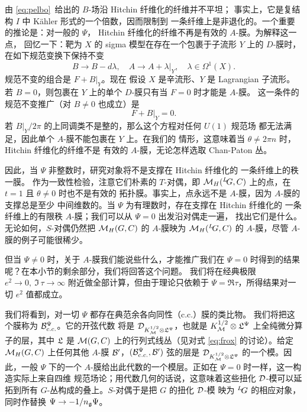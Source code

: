 由 \eqref{eq:pelbo}\ 给出的 $B$-场沿 Hitchin 纤维化的纤维并不平坦；
事实上，它是复结构 $I$ 中 Kähler 形式的一个倍数，因而限制到
一条纤维上是非退化的。一个重要的推论是：对一般的 $\Psi$，
Hitchin 纤维化的纤维不再是有效的 $A$-膜。为解释这一点，
回忆一下：靶为 $X$ 的 sigma 模型在存在一个包裹于子流形 $Y$ 上的
$D$-膜时，在如下规范变换下保持不变 %
\setcounter{equation}{27}
\begin{equation}\label{eq:zebol}
B\to
B-d\lambda,\quad A\to A+\lambda\vert_Y,\quad \lambda\in
\Omega^1(X).
\end{equation}
 规范不变的组合是 $F+B\vert_Y$。现在
假设 $X$ 是辛流形、$Y$ 是 Lagrangian 子流形。若 $B=0$，则包裹在
$Y$ 上的单个 $D$-膜只有当 $F=0$ 时才能是 $A$-膜。
这一条件的规范不变推广（对 $B\neq 0$ 也成立）是 %
\setcounter{equation}{28}
\begin{equation}\label{eq:subol}
F+B\vert_Y=0.
\end{equation}
 若
$B|_Y/2\pi$ 的上同调类不是整的，那么这个方程对任何 $U(1)$ 规范场
都无法满足，因此单个 $A$-膜不能包裹在 $Y$ 上。在我们的
情形，这意味着当 $\theta\neq 2\pi n$ 时，Hitchin 纤维化的纤维不是
有效的 $A$-膜，无论怎样选取 Chan-Paton 丛。

因此，当 $\Psi$ 非整数时，研究对象将不是支撑在 Hitchin 纤维化的
一条纤维上的秩一膜。
 作为一致性检验，注意它们朴素的 $T$-对偶，即
$\MH(\LG,C)$ 上的点，在 $t=1$ 且 $\theta\neq 0$ 时也不是有效的
拓扑膜。事实上，点永远不是 $A$-膜，因为 $A$-膜的支撑总是至少
中间维数的。当 $\Psi$ 为有理数时，存在支撑在 Hitchin 纤维化的
一条纤维上的有限秩 $A$-膜；我们可以从 $\Psi=0$ 出发沿对偶走一遍，
找出它们是什么。
无论如何，$S$-对偶仍然把 $\MH(G,C)$ 的 $A$-膜映为
$\MH(\LG,C)$ 的 $A$-膜，尽管 $A$-膜的例子可能很稀少。

但当 $\Psi\not=0$ 时，关于 $A$-膜我们能说些什么，才能推广我们在
$\Psi=0$ 时得到的结果呢？在本小节的剩余部分，我们将回答这个问题。
 我们将在经典极限 $e^2\to
0,\ \Im\,\tau\to \infty$ 附近做全部计算，但由于理论只依赖于
$\Psi=\Re\tau$，所得结果对一切 $e^2$ 值都成立。

我们将看到，对一切 $\Psi$ 都存在典范余各向同性（c.c.）膜的类比物。
我们将把这个膜称为 ${\cal B}_{c.c.}^\Psi$。它的开弦代数
将是 ${\cal
D}_{K_{\EUM}^{1/2}\otimes {{{\frak L}}}^\Psi}$，也就是
$K_\M^{1/2}\otimes{\frak
L}^\Psi$ 上全纯微分算子的层，其中 ${\frak L}$ 是
$\cM(G,C)$ 上的行列式线丛（见对式 \eqref{eq:frox} 的讨论）。给定
$\MH(G,C)$ 上任何其他 $A$-膜 ${\cal B}'$，$({\cal
B}_{c.c.}^\Psi,{\cal B}')$ 弦的层是 ${\cal D}_{K_{
\EUM}^{1/2}\otimes {{{\frak L}}}^\Psi}$ 的一个模。因此，一般 $\Psi$
下的一个 $A$-膜给出此代数的一个模层。正如在
$\Psi=0$ 时一样，这一构造实际上来自四维
规范场论；用代数几何的话说，这意味着这些扭化
${\cal D}$-模可以延拓到所有
$G$-丛构成的叠上。$S$-对偶于是把 $G$ 的扭化 ${\cal D}$-模
映为 $^L\negthinspace G$ 的相应对象，同时作替换 $\Psi\to
-1/n_{\frak g}\Psi$。


